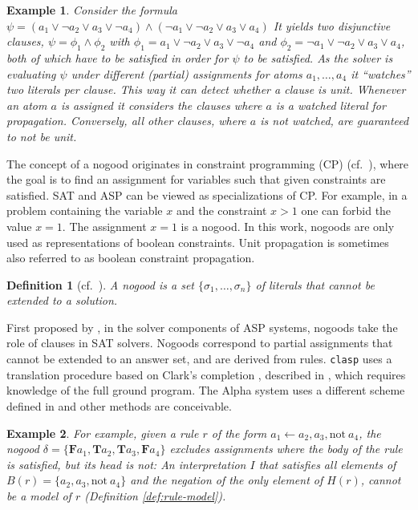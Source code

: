 \documentclass[final]{vutinfth} %
\newtheorem{example}{Example}[chapter]
\newtheorem{definition}{Definition}[chapter]
\newcommand{\bT}{\mathbf{T}}
\newcommand{\bF}{\mathbf{F}}
\newcommand{\headf}{H}
\newcommand{\bodyf}{B}
\newcommand{\fail}{\mathrm{not } \ \xspace}
\newcommand{\from}{\ensuremath{\leftarrow}}
\newcommand{\bsgl}{\sigma}
\newcommand{\clasp}{\texttt{clasp}\xspace}
\begin{document}
\begin{example}
\label{ex:clause-prop}
Consider the formula $\psi = (a_1 \vee \neg a_2 \vee a_3 \vee \neg a_4) \wedge (\neg a_1 \vee \neg a_2 \vee a_3 \vee a_4)$ It yields two  disjunctive clauses, $\psi = \phi_1 \wedge \phi_2$ with $\phi_1 = a_1 \vee \neg a_2 \vee a_3 \vee \neg a_4$ and $\phi_2 = \neg a_1 \vee \neg a_2 \vee a_3 \vee a_4$, both of which have to be satisfied in order for $\psi$ to be satisfied. As the solver is evaluating $\psi$ under different (partial) assignments for atoms $a_1, \ldots, a_4$ it \enquote{watches} two literals per clause. This way it can detect whether a clause is unit. Whenever an atom $a$ is assigned it considers the clauses where $a$ is a watched literal for propagation. Conversely, all other clauses, where $a$ is not watched, are guaranteed to not be unit.
\end{example}

The concept of a nogood originates in constraint programming (CP) (cf.~\cite{clasp,handbook-cp,handbook-kr-cp}), where the goal is to find an assignment for variables such that given constraints are satisfied. SAT and ASP can be viewed as specializations of CP. For example, in a problem containing the variable $x$ and the constraint $x > 1$ one can forbid the value $x = 1$. The assignment $x = 1$ is a nogood. In this work, nogoods are only used as representations of boolean constraints. Unit propagation is sometimes also referred to as boolean constraint propagation.

\begin{definition}[cf.~\cite{handbook-cp}]
\label{def:nogood}
A \emph{nogood} is a set $\{ \bsgl_1, \ldots, \bsgl_n \}$ of literals that cannot be extended to a solution.
\end{definition}

First proposed by \citet{clasp-first}, in the solver components of ASP systems, nogoods take the role of clauses in SAT solvers. Nogoods correspond to partial assignments that cannot be extended to an answer set, and are derived from rules. \clasp uses a translation procedure based on Clark's completion \cite{clark}, described in \cite[Section 3]{clasp}, which requires knowledge of the full ground program. The Alpha system uses a different scheme defined in \cite[Definition 5]{blend} and other methods are conceivable.

\begin{example}
\label{ex:rule-to-nogood}
For example, given a rule $r$ of the form $a_1 \from a_2, a_3, \fail a_4$, the nogood $\delta = \{\bF a_1, \bT a_2, \bT a_3, \bF a_4 \}$ excludes assignments where the body of the rule is satisfied, but its head is not: An interpretation $I$ that satisfies all elements of $\bodyf(r) = \{a_2, a_3, \fail a_4 \}$ and the negation of the only element of $\headf(r)$, cannot be a model of $r$ (Definition \ref{def:rule-model}).
\end{example}
\end{document}
